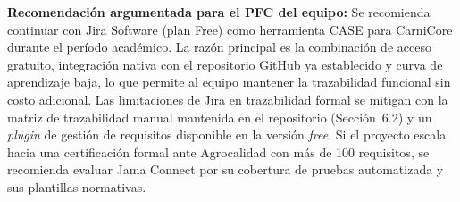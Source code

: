 \documentclass[11pt,a4paper]{article}
\begin{document}
\textbf{Recomendación argumentada para el PFC del equipo:} Se recomienda continuar
con Jira Software (plan Free) como herramienta CASE para CarniCore durante el
período académico. La razón principal es la combinación de acceso gratuito, integración
nativa con el repositorio GitHub ya establecido y curva de aprendizaje baja, lo que permite
al equipo mantener la trazabilidad funcional sin costo adicional. Las limitaciones de Jira en
trazabilidad formal se mitigan con la matriz de trazabilidad manual mantenida en el repositorio
(Sección~6.2) y un \textit{plugin} de gestión de requisitos disponible en la versión \textit{free}. Si el proyecto
escala hacia una certificación formal ante Agrocalidad con más de 100 requisitos, se recomienda
evaluar Jama Connect por su cobertura de pruebas automatizada y sus plantillas normativas.

\end{document}
